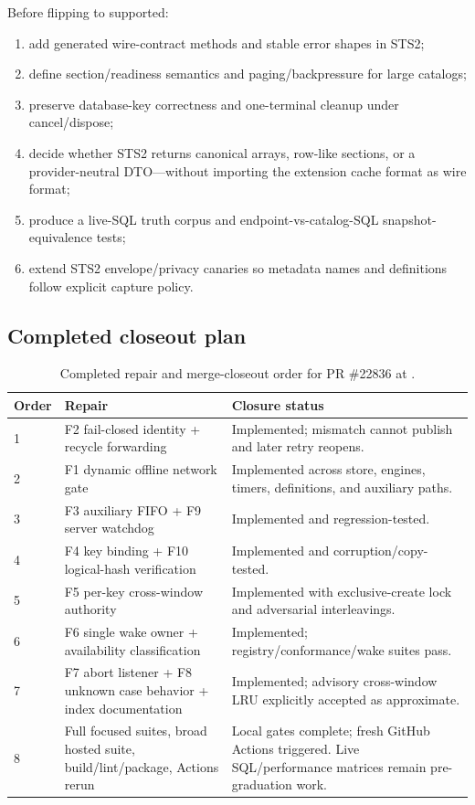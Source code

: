 \documentclass[11pt]{article}
\newcommand{\code}[1]{\texttt{\detokenize{#1}}}
\begin{document}
Before flipping \code{metadata.endpoints} to supported:

\begin{enumerate}
  \item add generated wire-contract methods and stable error shapes in STS2;
  \item define section/readiness semantics and paging/backpressure for large catalogs;
  \item preserve database-key correctness and one-terminal cleanup under cancel/dispose;
  \item decide whether STS2 returns canonical arrays, row-like sections, or a provider-neutral DTO---without importing the extension cache format as wire format;
  \item produce a live-SQL truth corpus and endpoint-vs-catalog-SQL snapshot-equivalence tests;
  \item extend STS2 envelope/privacy canaries so metadata names and definitions follow explicit capture policy.
\end{enumerate}

\subsection{Completed closeout plan}\label{sec:blockers}

\begin{table}[H]
\centering
\small
\caption{Completed repair and merge-closeout order for PR \#22836 at \code{69ca292f8}.}
\label{tab:repairorder}
\begin{tabularx}{\textwidth}{@{}p{}p{}X@{}}
\toprule
\textbf{Order} & \textbf{Repair} & \textbf{Closure status}\\
\midrule
1 & F2 fail-closed identity + recycle forwarding & Implemented; mismatch cannot publish and later retry reopens.\\
2 & F1 dynamic offline network gate & Implemented across store, engines, timers, definitions, and auxiliary paths.\\
3 & F3 auxiliary FIFO + F9 server watchdog & Implemented and regression-tested.\\
4 & F4 key binding + F10 logical-hash verification & Implemented and corruption/copy-tested.\\
5 & F5 per-key cross-window authority & Implemented with exclusive-create lock and adversarial interleavings.\\
6 & F6 single wake owner + availability classification & Implemented; registry/conformance/wake suites pass.\\
7 & F7 abort listener + F8 unknown case behavior + index documentation & Implemented; advisory cross-window LRU explicitly accepted as approximate.\\
8 & Full focused suites, broad hosted suite, build/lint/package, Actions rerun & Local gates complete; fresh GitHub Actions triggered. Live SQL/performance matrices remain pre-graduation work.\\
\bottomrule
\end{tabularx}
\end{table}
\end{document}
